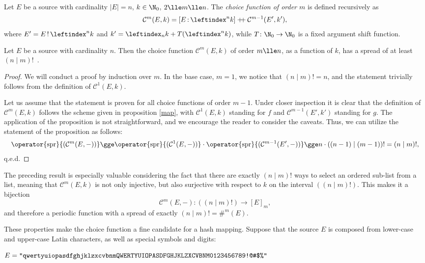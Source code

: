 \documentclass[12pt, a4paper]{article}
\renewcommand{\C}{\mathcal{C}}
\newcommand{\dop}{\mathbin{{+}\hspace{-1mm}{+}}}
\newcommand{\spr}[1]{\operator{\mathrm{spr}}{(#1)}}
\newcommand{\lli}[1]{\leftindex_{#1}}
\newcommand{\lui}[1]{\leftindex^{#1}}
\newcommand{\elt}{\mathop{:}}
\newcommand{\wo}{\mathop{!}}
\begin{document}
\begin{definition}
    Let $ E $ be a source with cardinality $ |E| = n $, $ k \in \N_0 $, $ 2 \lle m \lle n $. The \emph{choice function of order $ m $} is defined recursively as
    \[ \C^m(E, k) = [E \elt \lui{n}k] \dop \C^{m-1}(E', k'), \]
    where $ E' = E \wo \lui{n}k $ and $ k' = \lli{n}k + T(\lui{n}k) $, while $ T \colon \N_0 \to \N_0 $ is a fixed argument shift function.
\end{definition}

\begin{proposition}
    Let $ E $ be a source with cardinality $ n $. Then the choice function $ \C^m(E, k) $ of order $ m \lle n $, as a function of $ k $, has a spread of at least $ (n \mid m)! $\ .
\end{proposition}
\begin{proof}
    We will conduct a proof by induction over $ m $. In the base case, $ m = 1 $, we notice that $ (n \mid m)! = n $, and the statement trivially follows from the definition of $ \C^1(E, k) $.

    Let us assume that the statement is proven for all choice functions of order $ m - 1 $. Under closer inspection it is clear that the definition of $ \C^m(E, k) $ follows the scheme given in proposition \ref{map}, with $ \C^1(E, k) $ standing for $ f $ and $ \C^{m-1}(E', k') $ standing for $ g $. The application of the proposition is not straightforward, and we encourage the reader to consider the caveats. Thus, we can utilize the statement of the proposition as follows:
    \[ \spr{\C^m(E, -)} \gge \spr{\C^1(E, -)} \cdot \spr{\C^{m-1}(E', -)} \gge n \cdot ((n-1) \mid (m-1))! = (n \mid m)!, \]
    q.e.d.
\end{proof}

The preceding result is especially valuable considering the fact that there are exactly $ (n \mid m)! $ ways to select an ordered sub-list from a list, meaning that $ \C^m(E, k) $ is not only injective, but also surjective with respect to $ k $ on the interval $ ((n \mid m)!) $. This makes it a bijection
\[ \C^m(E, -) \colon ((n \mid m)!) \to [E]_m, \]
and therefore a periodic function with a spread of exactly $ (n \mid m)! = \#^m(E) $.

These properties make the choice function a fine candidate for a hash mapping. Suppose that the source $ E $ is composed from lower-case and upper-case Latin characters, as well as special symbols and digits:

\begin{center}
    $ E = \mbox{\texttt{"qwertyuiopasdfghjklzxcvbnmQWERTYUIOPASDFGHJKLZXCVBNM0123456789!@\#\$\%"}} $
\end{center}
\end{document}

